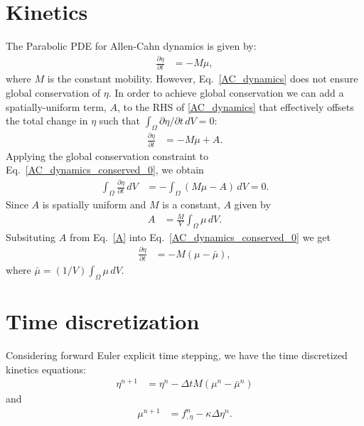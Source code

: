 \documentclass[10pt]{article}
\begin{document}
\section{Kinetics}
The Parabolic PDE for Allen-Cahn dynamics is given by:
\begin{align}
\label{AC_dynamics}
\frac{\partial \eta}{\partial t} &= -M\mu,
\end{align}
\noindent where $M$ is the constant mobility. However, Eq.~\eqref{AC_dynamics} does not ensure global conservation of $\eta$. In order to achieve global conservation we can add a spatially-uniform term, $A$, to the RHS of \eqref{AC_dynamics} that effectively offsets the total change in $\eta$ such that $\int_\Omega \partial \eta / \partial t\,dV =0$:
\begin{align}
\label{AC_dynamics_conserved_0}
\frac{\partial \eta}{\partial t} &= -M\mu+A.
\end{align}
Applying the global conservation constraint to Eq.~\eqref{AC_dynamics_conserved_0}, we obtain
\begin{align}
\label{AC_conservation condition}
\int_\Omega \frac{\partial \eta}{\partial t}\,dV &= -\int_\Omega (M\mu-A) \,dV = 0.
\end{align}
Since $A$ is spatially uniform and $M$ is a constant, $A$ given by
\begin{align}
\label{A}
A &= \frac{M}{V}\int_\Omega \mu \,dV.
\end{align}
Subsituting $A$ from Eq.~\eqref{A} into Eq.~\eqref{AC_dynamics_conserved_0} we get
\begin{align}
\label{AC_dynamics_conserved}
\frac{\partial \eta}{\partial t} &= -M(\mu-\bar{\mu}),
\end{align}
where $\bar{\mu} = (1/V)\int_\Omega \mu \,dV$.

\section{Time discretization}
Considering forward Euler explicit time stepping, we have the time discretized kinetics equations:
\begin{align}
\eta^{n+1} &= \eta^{n} - \Delta t M(\mu^n-\bar{\mu}^n)
\end{align}
and
\begin{align}
\mu^{n+1} &= f_{,\eta}^n -  \kappa \Delta \eta^n.
\end{align}
\end{document}
